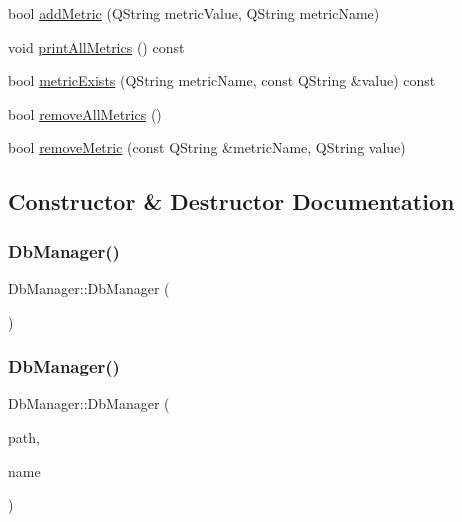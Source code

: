 \begin{DoxyCompactItemize}
\item 
bool \hyperlink{class_db_manager_aec06961d5c5f828bddca53d57b1783c6}{add\+Metric} (Q\+String metric\+Value, Q\+String metric\+Name)
\item 
void \hyperlink{class_db_manager_a403b78f34127ab02882b55e345c39e8b}{print\+All\+Metrics} () const
\item 
bool \hyperlink{class_db_manager_a2a88468ac169883b9f77cfcf3ec853c9}{metric\+Exists} (Q\+String metric\+Name, const Q\+String \&value) const
\item 
bool \hyperlink{class_db_manager_a64af0d562c9800c63fd98392d0e00cd8}{remove\+All\+Metrics} ()
\item 
bool \hyperlink{class_db_manager_ad6ef7d9cc1952d1ae9ad263df5715e71}{remove\+Metric} (const Q\+String \&metric\+Name, Q\+String value)
\end{DoxyCompactItemize}


\subsection{Constructor \& Destructor Documentation}
\mbox{\label{class_db_manager_a0d16cf5bba931362e6c581eb1b5ba66a}} 
\subsubsection{\texorpdfstring{Db\+Manager()}{DbManager()}\hspace{0.1cm}{\footnotesize\ttfamily [1/2]}}
{\footnotesize\ttfamily Db\+Manager\+::\+Db\+Manager (\begin{DoxyParamCaption}{ }\end{DoxyParamCaption})}

\mbox{\label{class_db_manager_a6427aaa42f5f4da4e86c52c2fd258729}} 
\subsubsection{\texorpdfstring{Db\+Manager()}{DbManager()}\hspace{0.1cm}{\footnotesize\ttfamily [2/2]}}
{\footnotesize\ttfamily Db\+Manager\+::\+Db\+Manager (\begin{DoxyParamCaption}\item[{const Q\+String}]{path,  }\item[{const Q\+String}]{name }\end{DoxyParamCaption})}

